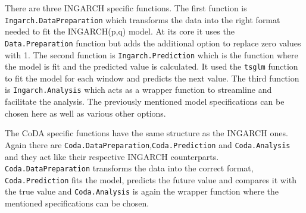 There are three INGARCH specific functions. The first function is \texttt{Ingarch.DataPreparation} which transforms the data into the right format needed to fit the INGARCH(p,q) model. At its core it uses the \texttt{Data.Preparation} function but adds the additional option to replace zero values with 1. The second function is \texttt{Ingarch.Prediction} which is the function where the model is fit and the predicted value is calculated. It used the \texttt{tsglm} function to fit the model for each window and predicts the next value. The third function is \texttt{Ingarch.Analysis} which acts as a wrapper function to streamline and facilitate the analysis. The previously mentioned model specifications can be chosen here as well as various other options. 

The CoDA specific functions have the same structure as the INGARCH ones. Again there are \texttt{Coda.DataPreparation},\texttt{Coda.Prediction} and \texttt{Coda.Analysis} and they act like their respective INGARCH counterparts. \texttt{Coda.DataPreparation} transforms the data into the correct format, \texttt{Coda.Prediction} fits the model, predicts the future value and compares it with the true value and \texttt{Coda.Analysis} is again the wrapper function where the mentioned specifications can be chosen. 

